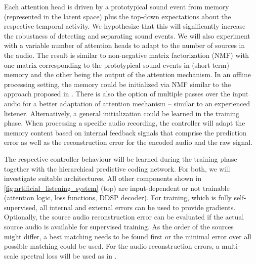 \documentclass[11pt]{article}
\begin{document}
Each attention head is driven by a prototypical sound event from memory (represented in the latent space) plus the top-down expectations about the respective temporal activity.
We hypothesize that this will significantly increase the robustness of detecting and separating sound events.
We will also experiment with a variable number of attention heads to adapt to the number of sources in the audio.
The result is similar to non-negative matrix factorization (NMF) with one matrix corresponding to the prototypical sound events in (short-term) memory and the other being the output of the attention mechanism.
In an offline processing setting, the memory could be initialized via NMF similar to the approach proposed in \cite{bellur2020taslp}.
There is also the option of multiple passes over the input audio for a better adaptation of attention mechanism -- similar to an experienced listener.
Alternatively, a general initialization could be learned in the training phase.
When processing a specific audio recording, the controller will adapt the memory content based on internal feedback signals that comprise the prediction error as well as the reconstruction error for the encoded audio and the raw signal.

The respective controller behaviour will be learned during the training phase together with the hierarchical predictive coding network. 
For both, we will investigate suitable architectures.
All other components shown in \autoref{fig:artificial_listening_system} (top) are input-dependent or not trainable (attention logic, loss functions, DDSP decoder).
For training, which is fully self-supervised, all internal and external errors can be used to provide gradients.
Optionally, the source audio reconstruction error can be evaluated if the actual source audio is available for supervised training.
As the order of the sources might differ, a best matching needs to be found first or the minimal error over all possible matching could be used.
For the audio reconstruction errors, a multi-scale spectral loss will be used as in \cite{engel2020ddsp}.

\end{document}
